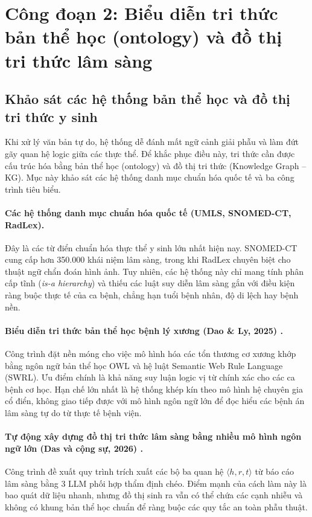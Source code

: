 \section{Công đoạn 2: Biểu diễn tri thức bản thể học (ontology) và đồ thị tri thức lâm sàng}

\subsection{Khảo sát các hệ thống bản thể học và đồ thị tri thức y sinh}
Khi xử lý văn bản tự do, hệ thống dễ đánh mất ngữ cảnh giải phẫu và làm đứt gãy quan hệ logic giữa các thực thể. Để khắc phục điều này, tri thức cần được cấu trúc hóa bằng bản thể học (ontology) và đồ thị tri thức (Knowledge Graph -- KG). Mục này khảo sát các hệ thống danh mục chuẩn hóa quốc tế và ba công trình tiêu biểu.

\paragraph{Các hệ thống danh mục chuẩn hóa quốc tế (UMLS, SNOMED-CT, RadLex).}
Đây là các từ điển chuẩn hóa thực thể y sinh lớn nhất hiện nay. SNOMED-CT cung cấp hơn 350.000 khái niệm lâm sàng, trong khi RadLex chuyên biệt cho thuật ngữ chẩn đoán hình ảnh. Tuy nhiên, các hệ thống này chỉ mang tính phân cấp tĩnh (\emph{is-a hierarchy}) và thiếu các luật suy diễn lâm sàng gắn với điều kiện ràng buộc thực tế của ca bệnh, chẳng hạn tuổi bệnh nhân, độ di lệch hay bệnh nền.

\paragraph{Biểu diễn tri thức bản thể học bệnh lý xương (Dao \& Ly, 2025) \cite{dao2025ontology}.}
Công trình đặt nền móng cho việc mô hình hóa các tổn thương cơ xương khớp bằng ngôn ngữ bản thể học OWL và hệ luật Semantic Web Rule Language (SWRL). Ưu điểm chính là khả năng suy luận logic vị từ chính xác cho các ca bệnh cơ học. Hạn chế lớn nhất là hệ thống khép kín theo mô hình hệ chuyên gia cổ điển, không giao tiếp được với mô hình ngôn ngữ lớn để đọc hiểu các bệnh án lâm sàng tự do từ thực tế bệnh viện.

\paragraph{Tự động xây dựng đồ thị tri thức lâm sàng bằng nhiều mô hình ngôn ngữ lớn (Das và cộng sự, 2026) \cite{das2025clinicalkg}.}
Công trình đề xuất quy trình trích xuất các bộ ba quan hệ $\langle h, r, t \rangle$ từ báo cáo lâm sàng bằng 3 LLM phối hợp thẩm định chéo. Điểm mạnh của cách làm này là bao quát dữ liệu nhanh, nhưng đồ thị sinh ra vẫn có thể chứa các cạnh nhiễu và không có khung bản thể học chuẩn để ràng buộc các quy tắc an toàn phẫu thuật.

